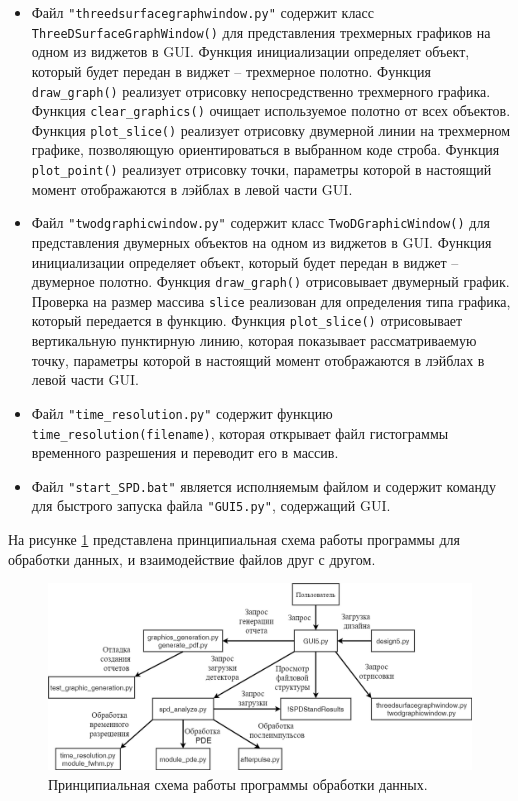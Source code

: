 \documentclass[12pt]{article}
\begin{document}
\begin{itemize}
   \item Файл \verb|"threedsurfacegraphwindow.py"| содержит класс \\ \verb|ThreeDSurfaceGraphWindow()| для представления трехмерных графиков на одном из виджетов в GUI. Функция инициализации определяет объект, который будет передан в виджет -- трехмерное полотно. Функция \verb|draw_graph()| реализует отрисовку непосредственно трехмерного графика. Функция \verb|clear_graphics()| очищает используемое полотно от всех объектов. Функция \verb|plot_slice()| реализует отрисовку двумерной линии на трехмерном графике, позволяющую ориентироваться в выбранном коде строба. Функция \verb|plot_point()| реализует отрисовку точки, параметры которой в настоящий момент отображаются в лэйблах в левой части GUI. 
   
   \item Файл \verb|"twodgraphicwindow.py"| содержит класс \verb|TwoDGraphicWindow()| для представления двумерных объектов на одном из виджетов в GUI. Функция инициализации определяет объект, который будет передан в виджет -- двумерное полотно. Функция \verb|draw_graph()| отрисовывает двумерный график. Проверка на размер массива \verb|slice| реализован для определения типа графика, который передается в функцию. Функция \verb|plot_slice()| отрисовывает вертикальную пунктирную линию, которая показывает рассматриваемую точку, параметры которой в настоящий момент отображаются в лэйблах в левой части GUI. 

   \item Файл \verb|"time_resolution.py"| содержит функцию \verb|time_resolution(filename)|, которая открывает файл гистограммы временного разрешения и переводит его в массив.

   \item Файл \verb|"start_SPD.bat"| является исполняемым файлом и содержит команду для быстрого запуска файла \verb|"GUI5.py"|, содержащий GUI. 
 
\end{itemize}


На рисунке \ref{fig:program_scheme} представлена принципиальная схема работы программы для обработки данных, и взаимодействие файлов друг с другом. 

\begin{figure}[h]\centering
	\includegraphics[width=1\textwidth]{program_scheme}
   \caption{Принципиальная схема работы программы обработки данных.}
   \label{fig:program_scheme}
\end{figure}
\end{document}

